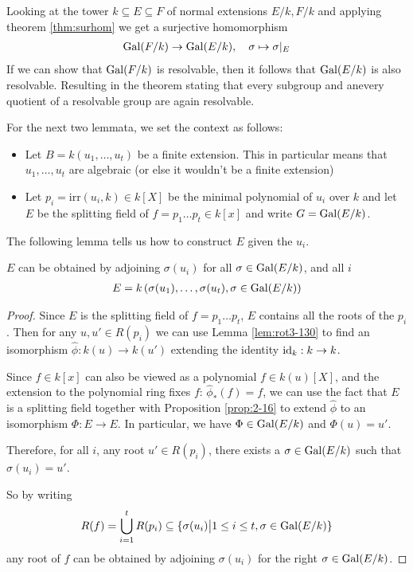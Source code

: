 Looking at the tower $k \subseteq E \subseteq F$ of normal extensions $E/k,F/k$ and applying theorem \ref{thm:surhom} we get a surjective homomorphism
\begin{align*}
  \operatorname{Gal}(F/k) \to  \operatorname{Gal}(E/k), \quad \sigma \mapsto \sigma|_E
\end{align*}
If we can show that $\operatorname{Gal}(F/k)$ is resolvable, then it follows that $\operatorname{Gal}(E/k)$ is also resolvable.
Resulting in the theorem stating that every subgroup and anevery quotient of a resolvable group are again resolvable.

For the next two lemmata, we set the context as follows:

\begin{itemize}
  \item Let $B = k(u_1,\ldots,u_t)$ be a finite extension. 
    This in particular means that $u_1,\ldots,u_t$ are algebraic (or else it wouldn't be a finite extension)
  \item Let $p_i = \text{irr}(u_i,k) \in k[X]$ be the minimal polynomial of $u_i$ over $k$ and let $E$ be the splitting field of $f = p_1 \dots p_t \in k[x]$ and write $G = \operatorname{Gal}(E/k)$.
\end{itemize}
The following lemma tells us how to construct $E$ given the $u_i$.
\begin{lem}[]
  $E$ can be obtained by adjoining $\sigma(u_i)$ for all $\sigma \in \operatorname{Gal}(E/k)$, and all $i$
  \begin{align*}
    E = k\left(\sigma(u_1), \ldots, \sigma(u_t), \sigma \in \operatorname{Gal}(E/k)
    \right)
  \end{align*}
\end{lem}
\begin{proof}
  Since $E$ is the splitting field of $f = p_1 \dots p_t$, $E$ contains all the roots of the $p_i$.
  Then for any $u,u' \in R(p_i)$ we can use Lemma \ref{lem:rot3-130} to find an isomorphism $\hat{\phi}: k(u) \to k(u')$ extending the identity $\operatorname{id}_k: k \to k$.

  Since $f \in k[x]$ can also be viewed as a polynomial $f \in k(u)[X]$, and the extension to the polynomial ring fixes $f$: $\hat{\phi}_{\ast}(f) = f$,
  we can use the fact that $E$ is a splitting field together with Proposition \ref{prop:2-16} to extend $\hat{\phi}$ to an isomorphism
$\Phi: E \to E$.
In particular, we have $\Phi \in \operatorname{Gal}(E/k)$ and $\Phi(u) = u'$.

Therefore, for all $i$, any root $u' \in R(p_i)$, there exists a $\sigma \in \operatorname{Gal}(E/k)$ such that $\sigma(u_i) = u'$.

So by writing
\begin{align*}
  R(f) = \bigcup_{i=1}^{t}R(p_i) \subseteq \{\sigma(u_i) \big\vert 1 \leq i \leq t, \sigma \in \operatorname{Gal}(E/k)\}
\end{align*}
any root of $f$ can be obtained by adjoining $\sigma(u_i)$ for the right $\sigma \in \operatorname{Gal}(E/k)$.
\end{proof} 
